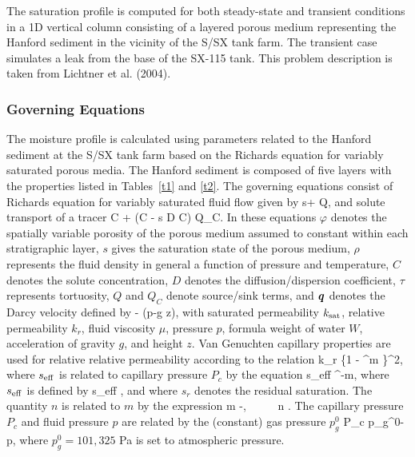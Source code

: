 The saturation profile is computed for both steady-state and transient conditions in a 1D vertical column consisting of a layered porous medium representing the Hanford sediment in the vicinity of the S/SX tank farm. The transient case simulates a leak from the base of the SX-115 tank. This problem description is taken from Lichtner et al. (2004).

\subsubsection{Governing Equations}

The moisture profile is calculated using parameters related to the Hanford sediment at the S/SX tank farm based on the Richards equation for variably saturated porous media. The Hanford sediment is composed of five layers with the properties listed in Tables~\ref{t1} and \ref{t2}. The governing equations consist of Richards equation for variably saturated fluid flow given by
\EQ
{} \varphi s\rho + \bnabla\cdot\bq\rho \eq Q,
\EN
and solute transport of a tracer
\EQ
{}\varphi C + \bnabla\cdot\big(\bq C - \varphi s \tau D \bnabla C\big) \eq Q_C.
\EN
In these equations $\varphi$ denotes the spatially variable porosity of the porous medium assumed to constant within each stratigraphic layer, $s$ gives the saturation state of the porous medium, $\rho$ represents the fluid density in general a function of pressure and temperature, $C$ denotes the solute concentration, $D$ denotes the diffusion/dispersion coefficient, $\tau$ represents tortuosity, $Q$ and $Q_C$ denote source/sink terms, and $\boldsymbol{q}$ denotes the Darcy velocity defined by
\EQ
\bq\eq -  \bnabla (p-\rho g z),
\EN
with saturated permeability $k_{\rm sat}$, relative permeability $k_r$, fluid viscosity $\mu$, pressure $p$, formula weight of water $W$, acceleration of gravity $g$, and height $z$. Van Genuchten capillary properties are used for relative relative permeability according to the relation
\EQ\label{kr}
k_{r} \eq {} \left\{1 - ^m \right\}^2, 
\EN
where $s_{\rm eff}$ is related to capillary pressure $P_c$ by the equation
\EQ\label{sat}
s_{\rm eff} \eq {}^{-m}, 
\EN 
where $s_{\rm 
eff}$ is defined by 
\EQ\label{seff1}
s_{\rm eff} \eq {}, 
\EN 
and where $s_r$ denotes the residual saturation. The quantity $n$ is related to $m$ by the expression 
\EQ\label{lambda} 
m -, \ \ \ \ \ n \eq {}. 
\EN 
The capillary pressure $P_c$ and fluid pressure $p$ are related by the (constant) gas pressure $p_g^0$
\EQ
P_c \eq p_g^0-p,
\EN
where $p_g^0 \!=\! 101,325$ Pa is set to atmospheric pressure.

